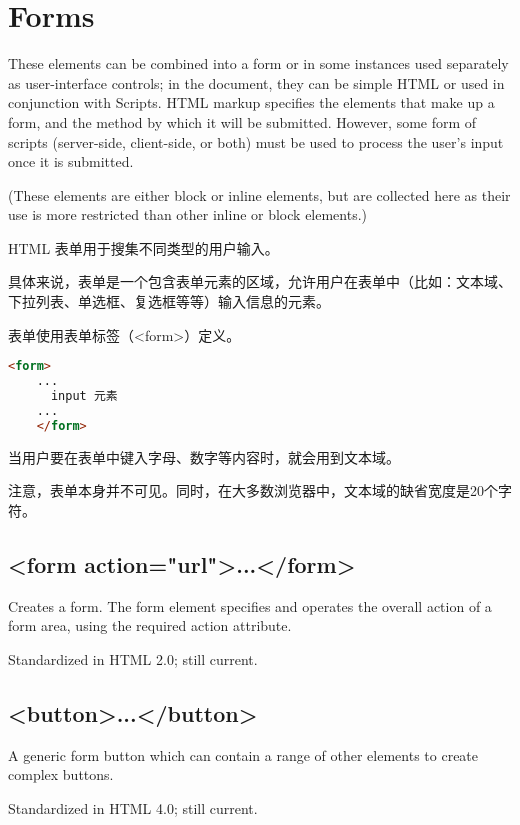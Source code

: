\section{Forms}


These elements can be combined into a form or in some instances used separately as user-interface controls; in the document, they can be simple HTML or used in conjunction with Scripts. HTML markup specifies the elements that make up a form, and the method by which it will be submitted. However, some form of scripts (server-side, client-side, or both) must be used to process the user’s input once it is submitted.




(These elements are either block or inline elements, but are collected here as their use is more restricted than other inline or block elements.)


HTML 表单用于搜集不同类型的用户输入。

具体来说，表单是一个包含表单元素的区域，允许用户在表单中（比如：文本域、下拉列表、单选框、复选框等等）输入信息的元素。

表单使用表单标签（<form>）定义。

\begin{lstlisting}[language=HTML]
	<form>
	...
	  input 元素
	...
	</form>
\end{lstlisting}

当用户要在表单中键入字母、数字等内容时，就会用到文本域。

注意，表单本身并不可见。同时，在大多数浏览器中，文本域的缺省宽度是20个字符。


\subsection{<form action="url">...</form>}

Creates a form. The form element specifies and operates the overall action of a form area, using the required action attribute.

Standardized in HTML 2.0; still current.


\subsection{<button>...</button>}

A generic form button which can contain a range of other elements to create complex buttons.

Standardized in HTML 4.0; still current.




